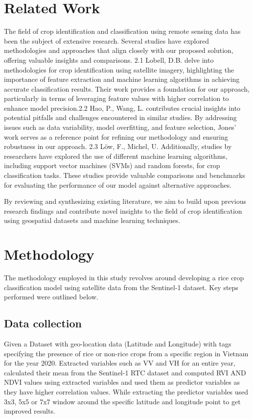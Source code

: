 \documentclass[12pt]{article}
\begin{document}
\section{Related Work}
The field of crop identification and classification using remote sensing data has been the subject of extensive research. Several studies have explored methodologies and approaches that align closely with our proposed solution, offering valuable insights and comparisons. 
\cite{Lobell2013} 2.1 Lobell, D.B. delve into methodologies for crop identification using satellite imagery, highlighting the importance of feature extraction and machine learning algorithms in achieving accurate classification results. Their work provides a foundation for our approach, particularly in terms of leveraging feature values with higher correlation to enhance model precision.\cite{HaoP2016}2.2 Hao, P., Wang, L. contributes crucial insights into potential pitfalls and challenges encountered in similar studies. By addressing issues such as data variability, model overfitting, and feature selection, Jones' work serves as a reference point for refining our methodology and ensuring robustness in our approach.\cite{Michel2013} 2.3 Löw, F., Michel, U. Additionally, studies by researchers have explored the use of different machine learning algorithms, including support vector machines (SVMs) and random forests, for crop classification tasks. These studies provide valuable comparisons and benchmarks for evaluating the performance of our model against alternative approaches.

By reviewing and synthesizing existing literature, we aim to build upon previous research findings and contribute novel insights to the field of crop identification using geospatial datasets and machine learning techniques.


\section{Methodology}
The methodology employed in this study revolves around developing a rice crop classification model using satellite data from the Sentinel-1 dataset. Key steps performed were outlined below.
\subsection{Data collection}
Given a Dataset with geo-location data (Latitude and Longitude) with tags specifying the presence of rice or non-rice crops from a specific region in Vietnam for the year 2020. Extracted variables such as VV and VH for an entire year, calculated their mean from the Sentinel-1 RTC dataset and computed RVI AND NDVI values using extracted variables and used them as predictor variables as they have higher correlation values. While extracting the predictor variables used 3x3, 5x5 or 7x7 window around the specific latitude and longitude point to get improved results.
\end{document}
